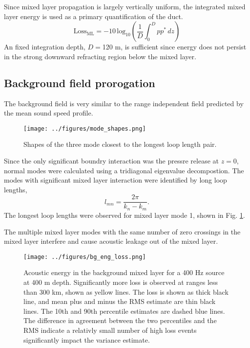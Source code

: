 \documentclass[preprint,NumberedRefs]{JASA}
\begin{document}
Since mixed layer propagation is largely vertically uniform, the integrated mixed layer energy is used as a primary quantification of the duct.
\begin{equation}
    \textrm{Loss}_{\textrm{ML}} = -10 \, \textrm{log}_{10} \left( \frac{1}{D} \int^{D}_0 p p^* \,  dz \right)
\end{equation}
An fixed integration depth, $D=$120 m, is sufficient since energy does not persist in the strong downward refracting region below the mixed layer.

\subsection{Background field prorogation}
The background field is very similar to the range independent field predicted by the mean sound speed profile.
\begin{figure}
\texttt{[image: ../figures/mode\_shapes.png]}
    \caption{\label{fig:bg_modes}{Shapes of the three mode closest to the longest loop length pair.}}
\end{figure}

Since the only significant boundry interaction was the pressre release at $z=0$, normal modes were calculated using a tridiagonal eigenvalue decompostion. The modes with significant mixed layer interaction were identified by long loop lengths,
\begin{equation}
    l_{mn} = \frac{2 \pi}{k_n - k_m}.
    \label{eq:loop_length}
\end{equation}
The longest loop lengths were observed for mixed layer mode 1, shown in Fig. \ref{fig:bg_modes}.

The multiple mixed layer modes with the same number of zero crossings in the mixed layer interfere and cause acoustic leakage out of the mixed layer.
\begin{figure}
\texttt{[image: ../figures/bg\_eng\_loss.png]}
    \caption{Acoustic energy in the background mixed layer for a 400 Hz source at 400 m depth. Significantly more loss is observed at ranges less than 300 km, shown as yellow lines. The loss is shown as thick black line, and mean plus and minus the RMS estimate are thin black lines. The 10th and 90th percentile estimates are dashed blue lines. The difference in agreement between the two percentiles and the RMS indicate a relativly small number of high loss events significantly impact the variance estimate.}
    \label{fig:bg_eng}
\end{figure}
\end{document}
